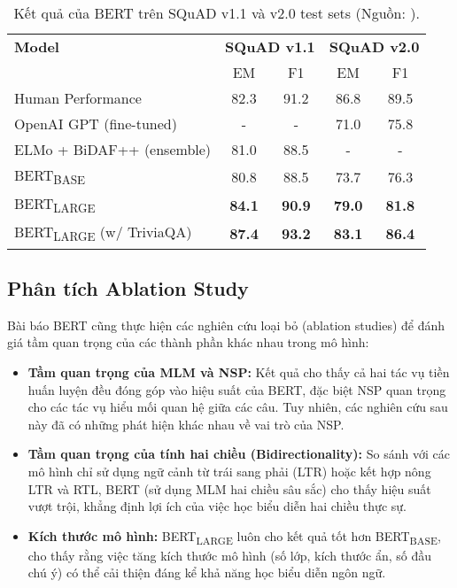 \begin{table}[H]
    \centering
    \caption{Kết quả của BERT trên SQuAD v1.1 và v2.0 test sets (Nguồn: \cite{devlin2018bert}).}
    \label{tab:squad_results}
    \begin{tabular}{lcccc}
        \toprule
        \textbf{Model} & \multicolumn{2}{c}{\textbf{SQuAD v1.1}} & \multicolumn{2}{c}{\textbf{SQuAD v2.0}} \\
         & EM & F1 & EM & F1 \\
        \midrule
        Human Performance & 82.3 & 91.2 & 86.8 & 89.5 \\
        OpenAI GPT (fine-tuned) & - & - & 71.0 & 75.8 \\ %
        ELMo + BiDAF++ (ensemble) & 81.0 & 88.5 & - & - \\ %
        \midrule
        BERT\textsubscript{BASE} & 80.8 & 88.5 & 73.7 & 76.3 \\
        BERT\textsubscript{LARGE} & \textbf{84.1} & \textbf{90.9} & \textbf{79.0} & \textbf{81.8} \\ %
        BERT\textsubscript{LARGE} (w/ TriviaQA) & \textbf{87.4} & \textbf{93.2} & \textbf{83.1} & \textbf{86.4} \\ %
        \bottomrule
    \end{tabular}
\end{table}

\subsection{Phân tích Ablation Study}
\label{ssec:ablation_study}
Bài báo BERT cũng thực hiện các nghiên cứu loại bỏ (ablation studies) để đánh giá tầm quan trọng của các thành phần khác nhau trong mô hình:
\begin{itemize}
    \item \textbf{Tầm quan trọng của MLM và NSP:} Kết quả cho thấy cả hai tác vụ tiền huấn luyện đều đóng góp vào hiệu suất của BERT, đặc biệt NSP quan trọng cho các tác vụ hiểu mối quan hệ giữa các câu. Tuy nhiên, các nghiên cứu sau này đã có những phát hiện khác nhau về vai trò của NSP.
    \item \textbf{Tầm quan trọng của tính hai chiều (Bidirectionality):} So sánh với các mô hình chỉ sử dụng ngữ cảnh từ trái sang phải (LTR) hoặc kết hợp nông LTR và RTL, BERT (sử dụng MLM hai chiều sâu sắc) cho thấy hiệu suất vượt trội, khẳng định lợi ích của việc học biểu diễn hai chiều thực sự.
    \item \textbf{Kích thước mô hình:} BERT\textsubscript{LARGE} luôn cho kết quả tốt hơn BERT\textsubscript{BASE}, cho thấy rằng việc tăng kích thước mô hình (số lớp, kích thước ẩn, số đầu chú ý) có thể cải thiện đáng kể khả năng học biểu diễn ngôn ngữ.
\end{itemize}

